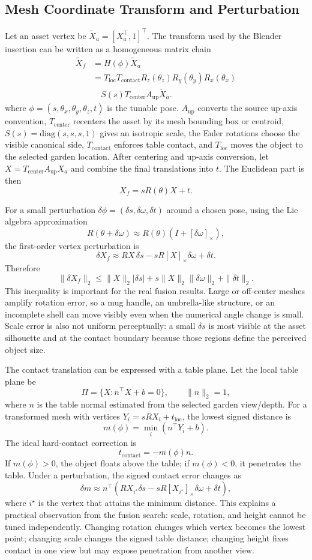 \documentclass[10pt,twocolumn,letterpaper]{article}
\begin{document}
\subsection{Mesh Coordinate Transform and Perturbation}
Let an asset vertex be $\tilde X_a=[X_a^\top,1]^\top$.
The transform used by the Blender insertion can be written as a homogeneous matrix chain
\[
\begin{aligned}
\tilde X_f
&=H(\phi)\tilde X_a\\
&=
T_{\mathrm{loc}}
T_{\mathrm{contact}}
R_z(\theta_z)R_y(\theta_y)R_x(\theta_x)\\
&\quad
S(s)T_{\mathrm{center}}A_{\mathrm{up}}\tilde X_a .
\end{aligned}
\]
where $\phi=(s,\theta_x,\theta_y,\theta_z,t)$ is the tunable pose.
$A_{\mathrm{up}}$ converts the source up-axis convention, $T_{\mathrm{center}}$ recenters the asset by its mesh bounding box or centroid, $S(s)=\mathrm{diag}(s,s,s,1)$ gives an isotropic scale, the Euler rotations choose the visible canonical side, $T_{\mathrm{contact}}$ enforces table contact, and $T_{\mathrm{loc}}$ moves the object to the selected garden location.
After centering and up-axis conversion, let $X=T_{\mathrm{center}}A_{\mathrm{up}}X_a$ and combine the final translations into $t$.
The Euclidean part is then
\[
X_f=sR(\theta)X+t .
\]

For a small perturbation $\delta\phi=(\delta s,\delta\omega,\delta t)$ around a chosen pose, using the Lie algebra approximation
\[
R(\theta+\delta\omega)\approx R(\theta)(I+[\delta\omega]_\times),
\]
the first-order vertex perturbation is
\[
\delta X_f
\approx
R X\,\delta s
-sR[X]_\times\delta\omega
+\delta t .
\]
Therefore
\[
\|\delta X_f\|_2
\le
\|X\|_2|\delta s|
+s\|X\|_2\|\delta\omega\|_2
+\|\delta t\|_2 .
\]
This inequality is important for the real fusion results.
Large or off-center meshes amplify rotation error, so a mug handle, an umbrella-like structure, or an incomplete shell can move visibly even when the numerical angle change is small.
Scale error is also not uniform perceptually: a small $\delta s$ is most visible at the asset silhouette and at the contact boundary because those regions define the perceived object size.

The contact translation can be expressed with a table plane.
Let the local table plane be
\[
\Pi=\{X:n^\top X+b=0\},\qquad \|n\|_2=1 ,
\]
where $n$ is the table normal estimated from the selected garden view/depth.
For a transformed mesh with vertices $Y_i=sRX_i+t_{\mathrm{loc}}$, the lowest signed distance is
\[
m(\phi)=\min_i(n^\top Y_i+b).
\]
The ideal hard-contact correction is
\[
t_{\mathrm{contact}}=-m(\phi)n .
\]
If $m(\phi)>0$, the object floats above the table; if $m(\phi)<0$, it penetrates the table.
Under a perturbation, the signed contact error changes as
\[
\delta m
\approx
n^\top(RX_{i^\star}\delta s-sR[X_{i^\star}]_\times\delta\omega+\delta t),
\]
where $i^\star$ is the vertex that attains the minimum distance.
This explains a practical observation from the fusion search: scale, rotation, and height cannot be tuned independently.
Changing rotation changes which vertex becomes the lowest point; changing scale changes the signed table distance; changing height fixes contact in one view but may expose penetration from another view.
\end{document}
